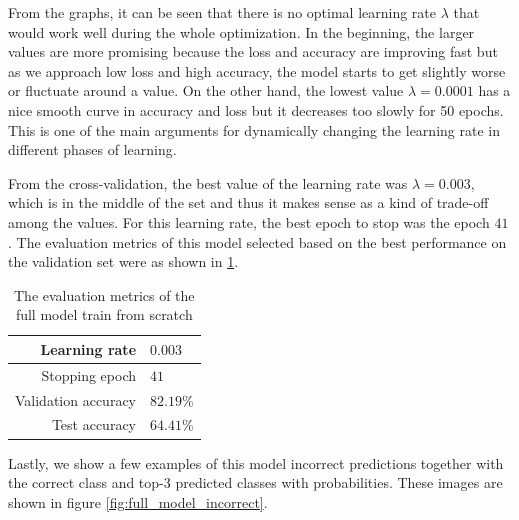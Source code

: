 \documentclass[a4paper,11pt]{article}
\begin{document}
From the graphs, it can be seen that there is no optimal learning rate $\lambda$ that would work well during the whole optimization.
In the beginning, the larger values are more promising because the loss and accuracy are improving fast but as we approach low loss and high accuracy, the model starts to get slightly worse or fluctuate around a value.
On the other hand, the lowest value $\lambda = 0.0001$ has a nice smooth curve in accuracy and loss but it decreases too slowly for 50 epochs.
This is one of the main arguments for dynamically changing the learning rate in different phases of learning.

From the cross-validation, the best value of the learning rate was $\lambda = 0.003$, which is in the middle of the set and thus it makes sense as a kind of trade-off among the values.
For this learning rate, the best epoch to stop was the epoch $41$.
The evaluation metrics of this model selected based on the best performance on the validation set were as shown in \ref{table:full_model_acc}.

\begin{table}[ht]
    \centering
    \begin{tabular}{ | r | l | }
        \hline
        Learning rate       & $0.003$   \\
        \hline
        Stopping epoch      & $41$      \\
        \hline
        Validation accuracy & $82.19\%$ \\
        \hline
        Test accuracy       & $64.41\%$ \\
        \hline
    \end{tabular}
    \caption{The evaluation metrics of the full model train from scratch}
    \label{table:full_model_acc}
\end{table}

Lastly, we show a few examples of this model incorrect predictions together with the correct class and top-3 predicted classes with probabilities.
These images are shown in figure \ref{fig:full_model_incorrect}.
\end{document}
